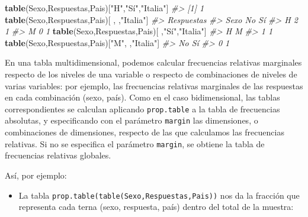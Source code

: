 \documentclass[
]{book}
\newenvironment{Shaded}{\begin{snugshade}}{\end{snugshade}}
\newcommand{\CommentTok}[1]{\textcolor[rgb]{0.56,0.35,0.01}{\textit{#1}}}
\newcommand{\KeywordTok}[1]{\textcolor[rgb]{0.13,0.29,0.53}{\textbf{#1}}}
\newcommand{\NormalTok}[1]{#1}
\newcommand{\StringTok}[1]{\textcolor[rgb]{0.31,0.60,0.02}{#1}}
\providecommand{\tightlist}{%
  \setlength{\itemsep}{0pt}\setlength{\parskip}{0pt}}
\theoremstyle{definition}
\theoremstyle{definition}
\theoremstyle{definition}
\theoremstyle{remark}
\begin{document}
\begin{Shaded}
\begin{Highlighting}[]
\KeywordTok{table}\NormalTok{(Sexo,Respuestas,Pais)[}\StringTok{"H"}\NormalTok{,}\StringTok{"Sí"}\NormalTok{,}\StringTok{"Italia"}\NormalTok{]}
\CommentTok{\#\textgreater{} [1] 1}
\KeywordTok{table}\NormalTok{(Sexo,Respuestas,Pais)[ , ,}\StringTok{"Italia"}\NormalTok{]}
\CommentTok{\#\textgreater{}     Respuestas}
\CommentTok{\#\textgreater{} Sexo No Sí}
\CommentTok{\#\textgreater{}    H  2  1}
\CommentTok{\#\textgreater{}    M  0  1}
\KeywordTok{table}\NormalTok{(Sexo,Respuestas,Pais)[  ,}\StringTok{"Sí"}\NormalTok{,}\StringTok{"Italia"}\NormalTok{]}
\CommentTok{\#\textgreater{} H M }
\CommentTok{\#\textgreater{} 1 1}
\KeywordTok{table}\NormalTok{(Sexo,Respuestas,Pais)[}\StringTok{"M"}\NormalTok{, ,}\StringTok{"Italia"}\NormalTok{]}
\CommentTok{\#\textgreater{} No Sí }
\CommentTok{\#\textgreater{}  0  1}
\end{Highlighting}
\end{Shaded}

En una tabla multidimensional, podemos calcular frecuencias relativas marginales respecto de los niveles de una variable o respecto de combinaciones de niveles de varias variables: por ejemplo, las frecuencias relativas marginales de las respuestas en cada combinación (sexo, país). Como en el caso bidimensional, las tablas correspondientes se calculan aplicando \texttt{prop.table} a la tabla de frecuencias absolutas, y especificando con el parámetro \texttt{margin} las dimensiones, o combinaciones de dimensiones, respecto de las que calculamos las frecuencias relativas. Si no se especifica el parámetro \texttt{margin}, se obtiene la tabla de frecuencias relativas globales.

Así, por ejemplo:

\begin{itemize}
\tightlist
\item
  La tabla \texttt{prop.table(table(Sexo,Respuestas,Pais))} nos da la fracción que representa cada terna (sexo, respuesta, país) dentro del total de la muestra:
\end{itemize}
\end{document}

